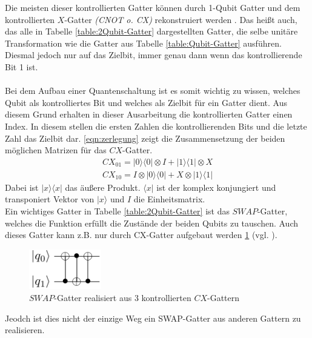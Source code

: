 Die meisten dieser kontrollierten Gatter k\"onnen durch 1-Qubit Gatter und dem kontrollierten $X$-Gatter \textit{(CNOT o. CX)} rekonstruiert werden \cite{Barenco_1995}. Das hei\ss t auch, das alle in Tabelle \ref{table:2Qubit-Gatter} dargestellten Gatter, die selbe unit\"are Transformation wie die Gatter aus Tabelle \ref{table:Qubit-Gatter} ausf\"uhren. Diesmal jedoch nur auf das Zielbit, immer genau dann wenn das kontrollierende Bit 1 ist. \\\\
Bei dem Aufbau einer Quantenschaltung ist es somit wichtig zu wissen, welches Qubit als kontrolliertes Bit und welches als Zielbit f\"ur ein Gatter dient. Aus diesem Grund erhalten in dieser Ausarbeitung die kontrollierten Gatter einen Index. In diesem stellen die ersten Zahlen die kontrollierenden Bits und die letzte Zahl das Zielbit dar. \ref{eqn:zerlegung} zeigt die Zusammensetzung der beiden m\"oglichen Matrizen f\"ur das $CX$-Gatter.
\begin{equation}\label{eqn:zerlegung}
\begin{aligned}
CX_{01} = |0\rangle\langle0|\otimes I +|1\rangle\langle1|\otimes X \\
CX_{10} = I \otimes |0\rangle\langle0|+X \otimes|1\rangle\langle1|
\end{aligned}
\end{equation}
Dabei ist $|x\rangle\langle x|$ das \"au\ss ere Produkt. $\langle x|$ ist der komplex konjungiert und transponiert Vektor von $|x\rangle$ und $I$ die Einheitsmatrix.\\
Ein wichtiges Gatter in Tabelle \ref{table:2Qubit-Gatter} ist das $SWAP$-Gatter, welches die Funktion erf\"ullt die Zust\"ande der beiden Qubits zu tauschen. Auch dieses Gatter kann z.B. nur durch CX-Gatter aufgebaut werden \ref{fig:cnot2swap} (vgl. \cite{Qiskit-Textbook}).
\begin{figure}[h]
\centering
\includegraphics[width=0.28\textwidth]{figures/cnot2swap.pdf}
\caption{$SWAP$-Gatter realisiert aus 3 kontrollierten $CX$-Gattern}
\label{fig:cnot2swap}
\end{figure}
Jeodch ist dies nicht der einzige Weg ein SWAP-Gatter aus anderen Gattern zu realisieren.

